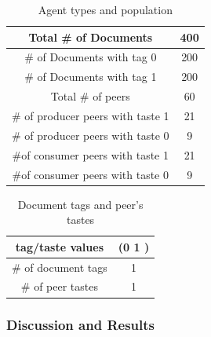 \documentclass [12pt]{article} \usepackage{multicol}
\begin{document}
\begin{table}[h!]
\caption{Agent types and population}
\begin{center}


\begin{tabular}{|c|c|}
\hline

Total \# of Documents &  400  \\ \hline
\# of Documents with tag 0 &  200  \\ \hline
\# of Documents with tag 1 &  200  \\ \hline

Total \# of peers & 60 \\ \hline
\# of producer peers with taste 1  & 21 \\ \hline
\# of producer peers with taste 0  & 9 \\ \hline 

\#of consumer peers with taste 1 & 21 \\ \hline
\#of consumer peers with taste 0 & 9 \\ \hline

\end{tabular}


\end{center}
\label{default}
\end{table}



\begin{table}[h!]
\caption{Document tags and peer's tastes}

\begin{center}

\begin{tabular}{|c|c|}
\hline tag/taste values & (0 1 )\\
\hline \# of document tags   &  1\\ \hline 
\# of peer tastes  &  1 \\ \hline 
\end{tabular}

\end{center}
\label{default}
\end{table}


\subsubsection{Discussion and Results}

\end{document}
